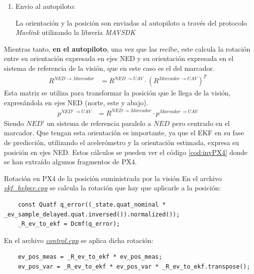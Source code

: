 \begin{enumerate}
	
\item Envio al autopiloto: 

	La orientación y la posición son enviadas al autopiloto a través del protocolo \textit{Mavlink} utilizando la librería \textit{MAVSDK}

\end{enumerate}

Mientras tanto, \textbf{en el autopiloto}, una vez que las recibe, este calcula la rotación entre su orientación expresada en ejes NED y su orientación expresada en el sistema de referencia de la visión, que en este caso es el del marcador. 
\begin{align}
R^{NED \rightarrow Marcador}& =  R^{NED \rightarrow UAV} \cdot  \left(R^{Marcador \rightarrow UAV}\right)^T
\end{align}
Esta matriz se utiliza para transformar la posición que le llega de la visión, expresándola en ejes NED (norte, este y abajo).
\begin{align}
p^{NED' \rightarrow UAV}& = R^{NED \rightarrow Marcador} \cdot p^{Marcador \rightarrow UAV}
\end{align}
Siendo $NED'$ un sistema de referencia paralelo a $NED$ pero centrado en el marcador.
Que tengan esta orientación es importante, ya que el EKF en su fase de predicción, utilizando el acelerómetro y la orientación estimada, expresa su posición en ejes NED.
Estos cálculos se pueden ver el código \ref{cod:invPX4} donde se han extraído algunos fragmentos de PX4. 

\begin{codigo}[label=cod:invPX4]{Rotación en PX4 de la posición suministrada por la visión}
En el archivo \href{https://github.com/PX4/PX4-ECL/blob/ec934908900b23ee273d1a9f82364b7b38423200/EKF/ekf\_helper.cpp\#L1460}{\textit{ekf\_helper.cpp}} se calcula la rotación que hay que aplicarle a la posición:
\begin{verbatim}
    const Quatf q_error((_state.quat_nominal * _ev_sample_delayed.quat.inversed()).normalized());
    _R_ev_to_ekf = Dcmf(q_error);
\end{verbatim}
En el archivo \href{https://github.com/PX4/PX4-ECL/blob/ec934908900b23ee273d1a9f82364b7b38423200/EKF/control.cpp\#L273}{\textit{control.cpp}} se aplica dicha rotación:
\begin{verbatim}
    ev_pos_meas = _R_ev_to_ekf * ev_pos_meas;
    ev_pos_var = _R_ev_to_ekf * ev_pos_var * _R_ev_to_ekf.transpose();
\end{verbatim}
\end{codigo} 


